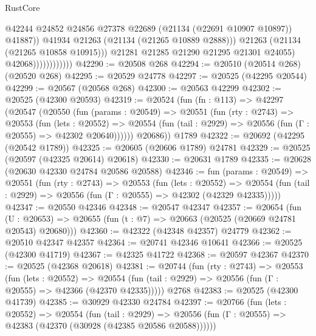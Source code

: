\begin{lexlean}{RustCore}
\begin{coremodule}
                                      @42244
                                      @24852
                                      @24856
                                      @27378
                                      @22689
                                      (@21134 (@22691 @10907 @10897))
                                      @41887))
                                  @41934
                                  @21263
                                  (@21134 (@21265 @10889 @2888)))
                                @21263
                                (@21134 (@21265 @10858 @10915)))
                              @21281
                              @21285
                              @21290
                              @21295
                              @21301
                              @24055)
                            @42068))))))))))))
@42290 := @20508 @268
@42294 := @20510 (@20514 @268) (@20520 @268)
@42295 := @20529 @24778
@42297 := @20525 (@42295 @20544)
@42299 := @20567 (@20568 @268)
@42300 := @20563 @42299
@42302 := @20525 (@42300 @20593)
@42319 := @20524
    (fun (fn : @113) =>
    @42297
      (@20547
        (@20550
          (fun (params : @20549) =>
          @20551
            (fun (rty : @2743) =>
            @20553
              (fun (lets : @20552) =>
              @20554 (fun (tail : @2929) => @20556 (fun (Γ : @20555) => @42302 @20640))))))
        @20686))
    @1789
@42322 := @20692 (@42295 (@20542 @1789))
@42325 := @20605 (@20606 @1789) @24781
@42329 := @20525 (@20597 (@42325 @20614) @20618)
@42330 := @20631 @1789
@42335 := @20628 (@20630 @42330 @24784 @20586 @20588)
@42346 := fun (params : @20549) =>
  @20551
    (fun (rty : @2743) =>
    @20553
      (fun (lets : @20552) =>
      @20554 (fun (tail : @2929) => @20556 (fun (Γ : @20555) => @42302 (@42329 @42335)))))
@42347 := @20550 @42346
@42348 := @20547 @42347
@42357 := @20654
    (fun (U : @20653) => @20655 (fun (t : @7) => @20663 (@20525 (@20669 @24781 @20543) @20680)))
@42360 := @42322 (@42348 @42357) @24779
@42362 := @20510 @42347 @42357
@42364 := @20741 @42346 @10641
@42366 := @20525 (@42300 @41719)
@42367 := @42325 @41722
@42368 := @20597 @42367
@42370 := @20525 (@42368 @20618)
@42381 := @20744
    (fun (rty : @2743) =>
    @20553
      (fun (lets : @20552) =>
      @20554 (fun (tail : @2929) => @20556 (fun (Γ : @20555) => @42366 (@42370 @42335)))))
    @2768
@42383 := @20525 (@42300 @41739)
@42385 := @30929 @42330 @24784
@42397 := @20766
    (fun (lets : @20552) =>
    @20554
      (fun (tail : @2929) =>
      @20556 (fun (Γ : @20555) => @42383 (@42370 (@30928 (@42385 @20586 @20588))))))

\end{coremodule}
\end{lexlean}
